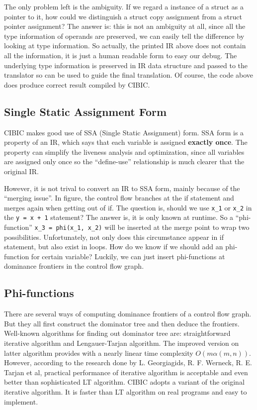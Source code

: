 \documentclass[10pt, a4paper]{article}
\begin{document}
\begin{enumerate}
    The only problem left is the ambiguity. If we regard a instance of a struct
    as a pointer to it, how could we distinguish a struct copy assignment from
    a struct pointer assignment? The answer is: this is not an ambiguity at
    all, since all the type information of operands are preserved, we can
    easily tell the difference by looking at type information. So actually, the
    printed IR above does not contain all the information, it is just a human
    readable form to easy our debug. The underlying type information is
    preserved in IR data structure and passed to the translator so can be used
    to guide the final translation. Of course, the code above does produce
    correct result compiled by CIBIC.
\end{enumerate}
\subsection{Single Static Assignment Form}
CIBIC makes good use of SSA (Single Static Assignment) form. SSA form is a
property of an IR, which says that each variable is assigned \textbf{exactly
once}. The property can simplify the liveness analysis and optimization, since
all variables are assigned only once so the ``define-use'' relationship is much
clearer that the original IR.

However, it is not trival to convert an IR to SSA form, mainly because of the
``merging issue''. In figure, the control flow branches at the if statement and
merges again when getting out of if. The question is, should we use
\texttt{x\_1} or \texttt{x\_2} in the \texttt{y = x + 1} statement? The answer
is, it is only known at runtime. So a ``phi-function'' \texttt{x\_3 = phi(x\_1,
x\_2)} will be inserted at the merge point to wrap two possibilities.
Unfortunately, not only does this circumstance appear in if statement, but also
exist in loops. How do we know if we should add an phi-function for certain
variable? Luckily, we can just insert phi-functions at dominance frontiers in
the control flow graph.
\subsection{Phi-functions}
There are several ways of computing dominance frontiers of a control flow graph.
But they all first construct the dominator tree and then deduce the frontiers.
Well-known algorithms for finding out dominator tree are: straightforward
iterative algorithm and Lengauer-Tarjan algorithm. The improved version on
latter algorithm provides with a nearly linear time complexity $O(m \alpha(m,
n))$. However, according to the research done by L. Georgiagids, R.  F. Werneck,
R. E. Tarjan et al, practical performance of iterative algorithm is acceptable
and even better than sophisticated LT algorithm. CIBIC adopts a variant of the
original iterative algorithm. It is faster than LT algorithm on real programs
and easy to implement.
\end{document}
